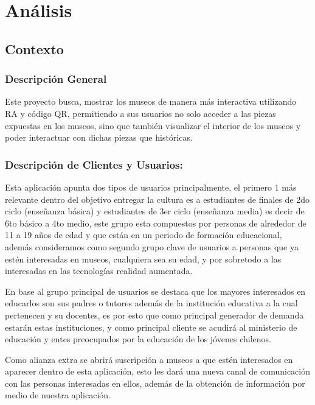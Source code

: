 \section{Análisis}

\subsection{Contexto}

\subsubsection{Descripción General}

Este proyecto busca, mostrar los museos de manera más interactiva utilizando RA y código QR, permitiendo a sus usuarios no solo acceder a las piezas expuestas en los museos, sino que también visualizar el interior de los museos y poder interactuar con dichas piezas que históricas.


\subsubsection{Descripción de Clientes y Usuarios:}

Esta aplicación apunta dos tipos de usuarios principalmente, el primero 1 más relevante dentro del objetivo entregar la cultura es a estudiantes de finales de 2do ciclo (enseñanza básica) y estudiantes de 3er ciclo (enseñanza media) es decir de 6to básico a 4to medio, este grupo esta compuestos por personas de alrededor de 11 a 19 años de edad y que están en un periodo de formación educacional, además consideramos como segundo grupo clave de usuarios a personas que ya estén interesadas en museos, cualquiera sea su edad, y por sobretodo a las interesadas en las tecnologías realidad aumentada.

En base al grupo principal de usuarios se destaca que los mayores interesados en educarlos son sus padres o tutores además de la institución educativa a la cual pertenecen y su docentes, es por esto que como principal generador de demanda estarán estas instituciones, y como principal cliente se acudirá al ministerio de educación y entes preocupados por la educación de los jóvenes chilenos.

Como alianza extra se abrirá suscripción a museos a que estén interesados en aparecer dentro de esta aplicación, esto les dará una nueva canal de comunicación con las personas interesadas en ellos, además de la obtención de información por medio de nuestra aplicación.


